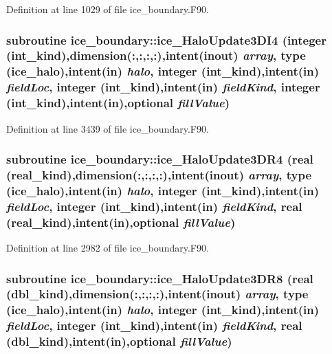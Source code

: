 Definition at line 1029 of file ice\_\-boundary.F90.\hypertarget{namespaceice__boundary_aded647fb747da9f8efb04f5a67a4247b}{
\subsubsection[{ice\_\-HaloUpdate3DI4}]{\setlength{\rightskip}{0pt plus 5cm}subroutine ice\_\-boundary::ice\_\-HaloUpdate3DI4 (integer (int\_\-kind),dimension(:,:,:,:),intent(inout) {\em array}, \/  type (ice\_\-halo),intent(in) {\em halo}, \/  integer (int\_\-kind),intent(in) {\em fieldLoc}, \/  integer (int\_\-kind),intent(in) {\em fieldKind}, \/  integer (int\_\-kind),intent(in),optional {\em fillValue})}}
\label{namespaceice__boundary_aded647fb747da9f8efb04f5a67a4247b}


Definition at line 3439 of file ice\_\-boundary.F90.\hypertarget{namespaceice__boundary_a124672d4024a3a64a1c1ed1b8c8d000b}{
\subsubsection[{ice\_\-HaloUpdate3DR4}]{\setlength{\rightskip}{0pt plus 5cm}subroutine ice\_\-boundary::ice\_\-HaloUpdate3DR4 (real (real\_\-kind),dimension(:,:,:,:),intent(inout) {\em array}, \/  type (ice\_\-halo),intent(in) {\em halo}, \/  integer (int\_\-kind),intent(in) {\em fieldLoc}, \/  integer (int\_\-kind),intent(in) {\em fieldKind}, \/  real (real\_\-kind),intent(in),optional {\em fillValue})}}
\label{namespaceice__boundary_a124672d4024a3a64a1c1ed1b8c8d000b}


Definition at line 2982 of file ice\_\-boundary.F90.\hypertarget{namespaceice__boundary_a1b2030ac006215973cc7919ed7a0b8ba}{
\subsubsection[{ice\_\-HaloUpdate3DR8}]{\setlength{\rightskip}{0pt plus 5cm}subroutine ice\_\-boundary::ice\_\-HaloUpdate3DR8 (real (dbl\_\-kind),dimension(:,:,:,:),intent(inout) {\em array}, \/  type (ice\_\-halo),intent(in) {\em halo}, \/  integer (int\_\-kind),intent(in) {\em fieldLoc}, \/  integer (int\_\-kind),intent(in) {\em fieldKind}, \/  real (dbl\_\-kind),intent(in),optional {\em fillValue})}}
\label{namespaceice__boundary_a1b2030ac006215973cc7919ed7a0b8ba}


